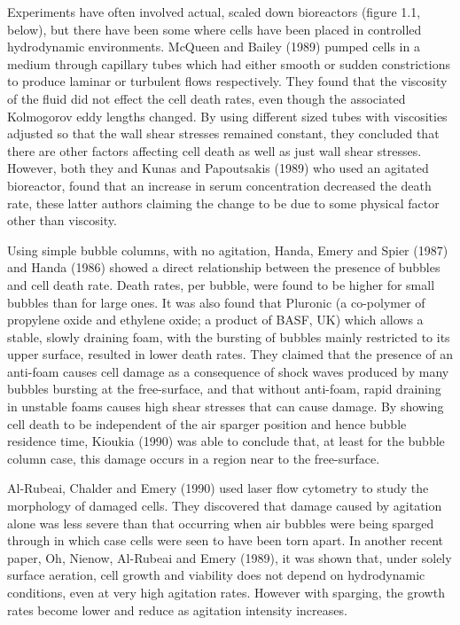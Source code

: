 Experiments have often involved actual, scaled down
bioreactors (figure 1.1, below), but there have been some where cells have 
been placed in controlled hydrodynamic environments. McQueen and Bailey (1989)
pumped cells in a medium through capillary tubes which had either smooth
or sudden constrictions to produce laminar or turbulent flows respectively.
They found that 
the viscosity of the fluid did not effect the cell death rates, 
even though the associated Kolmogorov eddy lengths changed.  By using 
different
sized tubes with viscosities adjusted so that the wall shear stresses
remained constant, they concluded that there are other factors affecting
cell death as well as just wall shear stresses. 
However, both they and
Kunas and Papoutsakis (1989) who used an agitated bioreactor, found 
that an increase in serum concentration decreased the death rate, these
latter authors claiming the change to be due to some
physical factor other than viscosity.
\vskip 10pt

\vskip 10pt
Using simple bubble columns, with no agitation, 
Handa, Emery and Spier (1987) and Handa (1986) showed a direct relationship
between the presence of bubbles and cell death rate. Death rates, per bubble, 
were found to be higher for small bubbles than for large ones.
It was also found that Pluronic (a co-polymer of propylene oxide
and ethylene oxide; a product of BASF, UK) which allows a stable, slowly 
draining foam, with the bursting of bubbles mainly restricted to its upper
surface, resulted in lower death rates. They claimed that the presence of an
anti-foam causes  cell damage as a consequence of shock waves produced by 
many bubbles bursting at the free-surface, and that without anti-foam,
rapid draining in unstable foams causes high shear stresses that can 
cause damage. By showing cell
death to be independent of the air sparger position and hence bubble
residence time,
Kioukia (1990) was able to conclude that, at least for the bubble 
column case, 
this damage occurs in a region near to the free-surface.

Al-Rubeai, Chalder and Emery (1990) used laser flow cytometry to study 
the morphology of damaged cells. They discovered that damage 
caused by agitation alone was less severe than that occurring when air bubbles
were being sparged through in which case cells were seen to have been torn 
apart.
In another recent paper, Oh, Nienow, Al-Rubeai and
Emery (1989), it was shown that, under solely surface aeration, cell growth
and viability does not depend on hydrodynamic conditions, even at very high
agitation rates. However with sparging, the growth rates become lower and 
reduce as agitation intensity increases.

